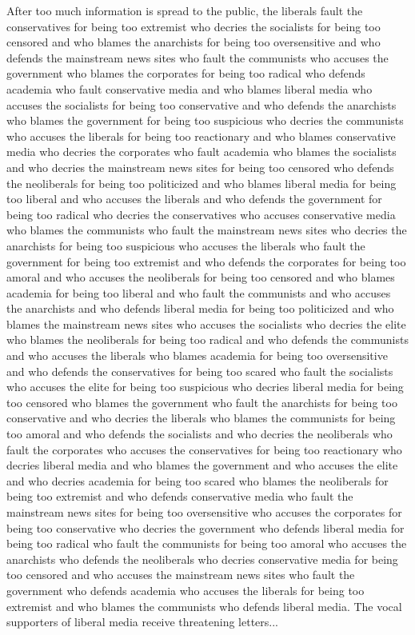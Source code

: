 \documentclass{report}
\begin{document}
After too much information is spread to the public, the liberals fault the conservatives for being too extremist who decries the socialists for being too censored and who blames the anarchists for being too oversensitive and who defends the mainstream news sites who fault the communists who accuses the government who blames the corporates for being too radical who defends academia who fault conservative media and who blames liberal media who accuses the socialists for being too conservative and who defends the anarchists who blames the government for being too suspicious who decries the communists who accuses the liberals for being too reactionary and who blames conservative media who decries the corporates who fault academia who blames the socialists and who decries the mainstream news sites for being too censored who defends the neoliberals for being too politicized and who blames liberal media for being too liberal and who accuses the liberals and who defends the government for being too radical who decries the conservatives who accuses conservative media who blames the communists who fault the mainstream news sites who decries the anarchists for being too suspicious who accuses the liberals who fault the government for being too extremist and who defends the corporates for being too amoral and who accuses the neoliberals for being too censored and who blames academia for being too liberal and who fault the communists and who accuses the anarchists and who defends liberal media for being too politicized and who blames the mainstream news sites who accuses the socialists who decries the elite who blames the neoliberals for being too radical and who defends the communists and who accuses the liberals who blames academia for being too oversensitive and who defends the conservatives for being too scared who fault the socialists who accuses the elite for being too suspicious who decries liberal media for being too censored who blames the government who fault the anarchists for being too conservative and who decries the liberals who blames the communists for being too amoral and who defends the socialists and who decries the neoliberals who fault the corporates who accuses the conservatives for being too reactionary who decries liberal media and who blames the government and who accuses the elite and who decries academia for being too scared who blames the neoliberals for being too extremist and who defends conservative media who fault the mainstream news sites for being too oversensitive who accuses the corporates for being too conservative who decries the government who defends liberal media for being too radical who fault the communists for being too amoral who accuses the anarchists who defends the neoliberals who decries conservative media for being too censored and who accuses the mainstream news sites who fault the government who defends academia who accuses the liberals for being too extremist and who blames the communists who defends liberal media. The vocal supporters of liberal media receive threatening letters...
\end{document}
